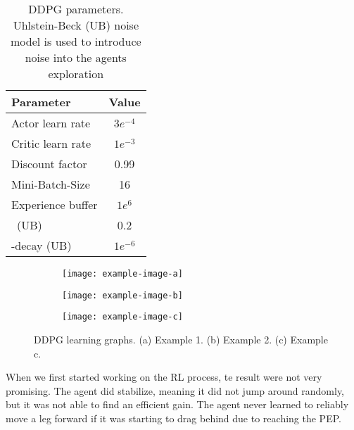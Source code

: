 \begin{table}
	\centering
	\begin{tabular}{| l | c |}
		\hline
		\textbf{Parameter} & \textbf{Value}\\
		\hline
		\hline
		Actor learn rate & $3e^{-4}$ \\
		Critic learn rate & $1e^{-3}$ \\
		Discount factor &  0.99 \\
		Mini-Batch-Size & 16 \\
		Experience buffer & $1e^6$\\
		\textsigma \ (UB) & 0.2 \\
		\textsigma-decay (UB) & $1e^{-6}$ \\
		
		\hline
	\end{tabular}
	\caption{DDPG parameters. Uhlstein-Beck (UB) noise model is used to introduce noise into the agents exploration}
	\label{table: DDPG parameters}
\end{table}


\begin{figure}[h]
	\begin{subfigure}{.5\textwidth} %
		\centering
		\texttt{[image: example-image-a]}  %
		\caption{}
		\label{figure: RL a}
	\end{subfigure}
	\begin{subfigure}{.5\textwidth}
		\centering
		\texttt{[image: example-image-b]}  
		\caption{}
		\label{figure: RL b}
	\end{subfigure} 
	\begin{subfigure}{\textwidth}
		\centering
		\texttt{[image: example-image-c]}   %
		\caption{}
		\label{figure: RL c}
	\end{subfigure}
	\caption[]{DDPG learning graphs. (a) Example 1. (b) Example 2. (c) Example c.}
	\label{figure: DDPG learning graphs}
\end{figure}



When we first started working on the RL process, te result were not very promising. The agent did stabilize, meaning it did not jump around randomly, but it was not able to find an efficient gain.
The agent never learned to reliably move a leg forward if it was starting to drag behind due to reaching the PEP.

